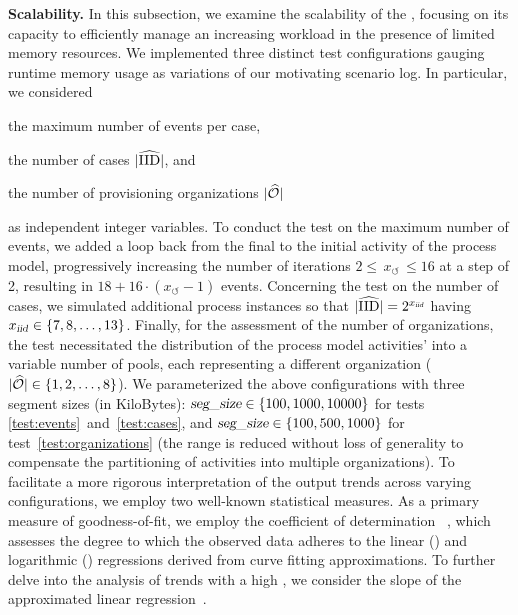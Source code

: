 \noindent\textbf{Scalability.}
In this subsection, we examine the scalability of the , focusing on its capacity to efficiently manage an increasing workload in the presence of limited memory resources. We implemented three distinct test configurations gauging runtime memory usage as variations of our motivating scenario log. In particular, we considered
\begin{inparaenum}[(I)]
	\item\label{test:events} the maximum number of events per case,
	\item\label{test:cases} the number of cases $|{\widehat{\mathrm{IID}}}|$, and 
	\item\label{test:organizations} the number of provisioning organizations $|{\widehat{\mathcal{O}}}|$
\end{inparaenum}
as independent integer variables. To conduct the test on the maximum number of events, we added a loop back from the final to the initial activity of the process model, progressively increasing the number of iterations $2 \leqslant \,x_\circlearrowleft\, \leqslant 16$ at a step of \num{2}, resulting in $18+16\cdot(x_\circlearrowleft-1)$ events. Concerning the test on the number of cases, we simulated additional process instances so that $|{\widehat{\mathrm{IID}}}| = 2^{x_{\textrm{\textsl{iid}}}}$ having $x_{\textrm{\textsl{iid}}} \in \{7,8,\ldots,13\}$. Finally, for the assessment of the number of organizations, the test necessitated the distribution of the process model activities' into a variable number of pools, each representing a different organization ($|{\widehat{\mathcal{O}}}| \in \{1,2,\ldots,8\}$).
%
We parameterized the above configurations with three segment sizes (in KiloBytes): $\textsl{seg\_size} \in \{100,1000,10000\}$ for tests \ref{test:events}~and~\ref{test:cases}, and $\textsl{seg\_size} \in \{100,500,1000\}$ for test~\ref{test:organizations} (the range is reduced without loss of generality to compensate the partitioning of activities into multiple organizations). To facilitate a more rigorous interpretation of the output trends across varying {\SegSize} configurations, we employ 
two well-known statistical measures. As a primary measure of goodness-of-fit, we employ the coefficient of determination {\RCoefficent}~\citep{barrett1974coefficient}, which assesses the degree to which the observed data adheres to the linear ({\Rlin}) and logarithmic ({\Rlog}) regressions derived from curve fitting approximations. To further delve into the analysis of trends with a high {\Rlin}, we consider the slope {\Slope} of the approximated linear regression~\citep{altman2015simplelinearregression}. 
